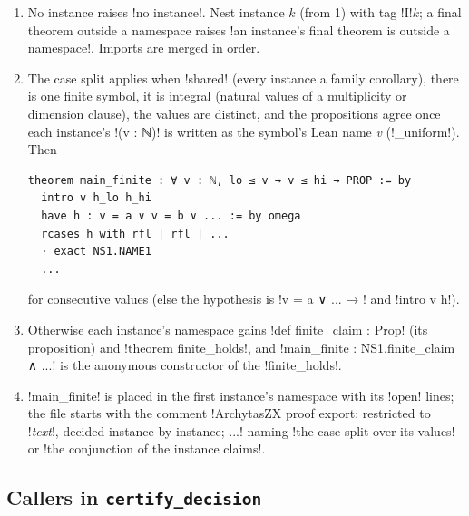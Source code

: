 {\begin{algorithm}[\py!combine!]\label{alg:lean-export-net-finite}
\begin{enumerate}
\item No instance raises \code!no instance!. Nest instance $k$ (from 1) with tag \code!I!$k$; a
  final theorem outside a namespace raises
  \code!an instance's final theorem is outside a namespace!. Imports are merged in order.
\item The case split applies when \py!shared! (every instance a family corollary), there is one
  finite symbol, it is integral (natural values of a multiplicity or dimension clause), the
  values are distinct, and the propositions agree once each instance's \code!(v : ℕ)! is written
  as the symbol's Lean name \textit{v} (\py!_uniform!). Then
\begin{lstlisting}[style=grammar]
theorem main_finite : ∀ v : ℕ, lo ≤ v → v ≤ hi → PROP := by
  intro v h_lo h_hi
  have h : v = a ∨ v = b ∨ ... := by omega
  rcases h with rfl | rfl | ...
  · exact NS1.NAME1
  ...
\end{lstlisting}
  for consecutive values (else the hypothesis is \code!v = a ∨ ... → ! and \code!intro v h!).
\item Otherwise each instance's namespace gains \code!def finite_claim : Prop! (its proposition)
  and \code!theorem finite_holds!, and \code!main_finite : NS1.finite_claim ∧ ...! is the
  anonymous constructor of the \code!finite_holds!.
\item \code!main_finite! is placed in the first instance's namespace with its \code!open! lines;
  the file starts with the comment
  \code!ArchytasZX proof export: restricted to !\textit{text}\code!, decided instance by instance; ...!
  naming \code!the case split over its values! or \code!the conjunction of the instance claims!.
\end{enumerate}
\end{algorithm}

\subsection{Callers in \texttt{certify\_decision}}\label{sec:lean-export-net-certify}

}
